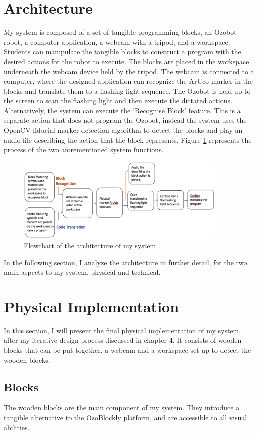 \documentclass[oneside,%
                    author={Malak Hajji},
                    degree={BSc},
                    title={Designing An Accessible Computational Toolkit For Students},
                  subtitle={With Mixed Visual Abilities}]{dissertation}
\begin{document}
\section{Architecture}
My system is composed of a set of tangible programming blocks, an Ozobot robot, a computer application, a webcam with a tripod, and a workspace. Students can manipulate the tangible blocks to construct a program with the desired actions for the robot to execute. The blocks are placed in the workspace underneath the webcam device held by the tripod. The webcam is connected to a computer, where the designed application can recognize the ArUco marker in the blocks and translate them to a flashing light sequence. The Ozobot is held up to the screen to scan the flashing light and then execute the dictated actions. Alternatively, the system can execute the ‘Recognise Block’ feature. This is a separate action that does not program the Ozobot, instead the system uses the OpenCV fiducial marker detection algorithm to detect the blocks and play an audio file describing the action that the block represents. Figure \ref{fig-flowchart} represents the process of the two aforementioned system functions.
\FloatBarrier
\begin{figure}[h]
    \centering
    \includegraphics[width=0.9\textwidth]{flowchart.eps}
    \caption{Flowchart of the architecture of my system}
    \label{fig-flowchart}
\end{figure}
\FloatBarrier
In the following section, I analyze the architecture in further detail, for the two main aspects to my system, physical and technical.
\section{Physical Implementation}
In this section, I will present the final physical implementation of my system, after my iterative design process discussed in chapter 4. It consists of wooden blocks that can be put together, a webcam and a workspace set up to detect the wooden blocks.
\subsection{Blocks}
The wooden blocks are the main component of my system. They introduce a tangible alternative to the OzoBlockly platform, and are accessible to all visual abilities.
\end{document}
